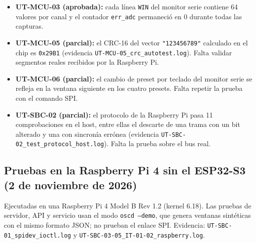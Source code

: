 \documentclass[12pt,a4paper]{article}
\begin{document}
\begin{itemize}
  \item \textbf{UT-MCU-03 (aprobada):} cada línea \texttt{WIN} del monitor serie contiene 64 valores por canal y el contador \texttt{err\_adc} permaneció en 0 durante todas las capturas.
  \item \textbf{UT-MCU-05 (parcial):} el CRC-16 del vector \texttt{"123456789"} calculado en el chip es \texttt{0x29B1} (evidencia \texttt{UT-MCU-05\_crc\_autotest.log}). Falta validar segmentos reales recibidos por la Raspberry Pi.
  \item \textbf{UT-MCU-06 (parcial):} el cambio de preset por teclado del monitor serie se refleja en la ventana siguiente en los cuatro presets. Falta repetir la prueba con el comando SPI.
  \item \textbf{UT-SBC-02 (parcial):} el protocolo de la Raspberry Pi pasa 11 comprobaciones en el host, entre ellas el descarte de una trama con un bit alterado y una con sincronía errónea (evidencia \texttt{UT-SBC-02\_test\_protocol\_host.log}). Falta la prueba sobre el bus real.
\end{itemize}

\subsection{Pruebas en la Raspberry Pi 4 sin el ESP32-S3 (2 de noviembre de 2026)}

Ejecutadas en una Raspberry Pi 4 Model B Rev 1.2 (kernel 6.18). Las pruebas de servidor, API y servicio usan el modo \texttt{oscd --demo}, que genera ventanas sintéticas con el mismo formato JSON; no prueban el enlace SPI. Evidencia: \texttt{UT-SBC-01\_spidev\_ioctl.log} y \texttt{UT-SBC-03-05\_IT-01-02\_raspberry.log}.
\end{document}
